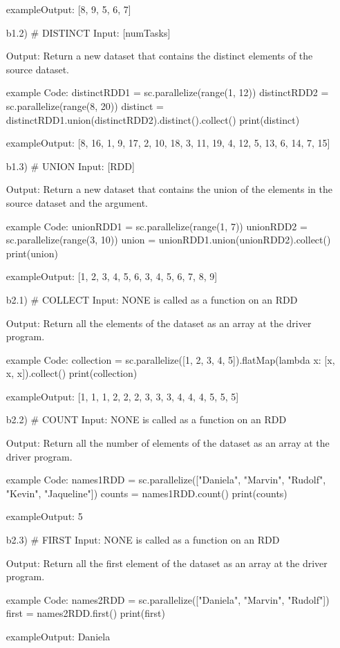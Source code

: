 \documentclass[11pt,a4paper]{scrartcl}
\begin{document}
\begin{itemize}
		exampleOutput:
		[8, 9, 5, 6, 7]
		
	\item[b1.2)]
		# DISTINCT
		Input:
		[numTasks]
		
		Output:
		Return a new dataset that contains the distinct elements of the source dataset.
		
		example Code:
		distinctRDD1 = sc.parallelize(range(1, 12))
    		distinctRDD2 = sc.parallelize(range(8, 20))
    		distinct = distinctRDD1.union(distinctRDD2).distinct().collect()
    		print(distinct)
		
		exampleOutput:
		[8, 16, 1, 9, 17, 2, 10, 18, 3, 11, 19, 4, 12, 5, 13, 6, 14, 7, 15]
		
	\item[b1.3)]
		# UNION
		Input:
		[RDD]
		
		Output:
		Return a new dataset that contains the union of the elements in the source dataset and the argument.
		
		example Code:
		unionRDD1 = sc.parallelize(range(1, 7))
    		unionRDD2 = sc.parallelize(range(3, 10))
    		union = unionRDD1.union(unionRDD2).collect()
    		print(union)
		
		exampleOutput:
		[1, 2, 3, 4, 5, 6, 3, 4, 5, 6, 7, 8, 9]
		
	\item[b2.1)]
		# COLLECT
		Input:
		NONE is called as a function on an RDD
		
		Output:
		Return all the elements of the dataset as an array at the driver program.
		
		example Code:
		collection = sc.parallelize([1, 2, 3, 4, 5]).flatMap(lambda x: [x, x, x]).collect()
    		print(collection)
		
		exampleOutput:
		[1, 1, 1, 2, 2, 2, 3, 3, 3, 4, 4, 4, 5, 5, 5]
		
	\item[b2.2)]
		# COUNT
		Input:
		NONE is called as a function on an RDD
		
		Output:
		Return all the number of elements of the dataset as an array at the driver program.
		
		example Code:
		names1RDD = sc.parallelize(["Daniela", "Marvin", "Rudolf", "Kevin", "Jaqueline"])
    		counts = names1RDD.count()
    		print(counts)
		
		exampleOutput:
		5
		
	\item[b2.3)]
		# FIRST
		Input:
		NONE is called as a function on an RDD
		
		Output:
		Return all the first element of the dataset as an array at the driver program.
		
		example Code:
		names2RDD = sc.parallelize(["Daniela", "Marvin", "Rudolf"])
   	 	first = names2RDD.first()
    		print(first)
		
		exampleOutput:
		Daniela
		
	\end{itemize}
\end{document}
